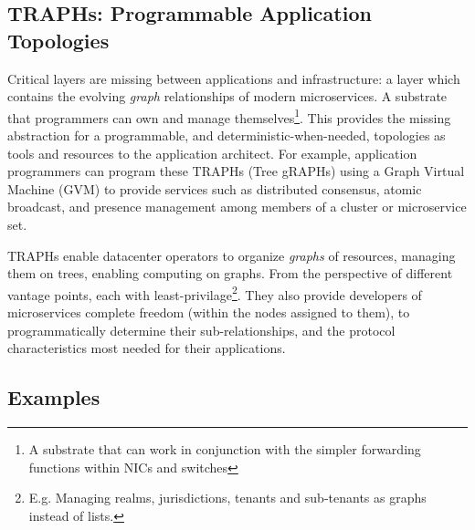 \documentclass[../../../OAE-SPEC-MAIN.tex]{subfiles}
\begin{document}
\subsection*{TRAPHs: Programmable Application Topologies}
 
Critical layers are missing between applications and infrastructure: a layer which contains the evolving \emph{graph} relationships of modern microservices. A substrate that  programmers can own and manage themselves\footnote{A substrate that can work in conjunction with the simpler forwarding functions within NICs and switches}.
This provides the missing abstraction for a programmable, and deterministic-when-needed, topologies as tools and resources to the application architect. For example, application programmers can program these TRAPHs (Tree gRAPHs) using a Graph Virtual Machine (GVM) to provide services such as distributed consensus, atomic broadcast, and presence management among members of a cluster or microservice set. %

TRAPHs enable datacenter operators to organize \emph{graphs} of resources, managing them on trees, enabling computing on graphs. From the perspective of different vantage points, each with least-privilage\footnote{E.g. Managing realms, jurisdictions, tenants and sub-tenants as graphs instead of lists.}. They also provide developers of microservices complete freedom (within the nodes assigned to them), to programmatically determine their sub-relationships, and the protocol characteristics most needed for their applications.


\subsection*{Examples}
\end{document}
